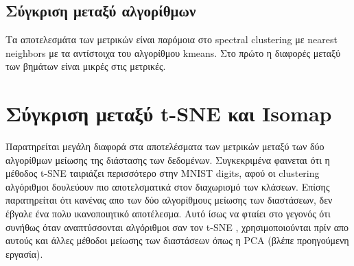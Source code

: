 \subsection{Σύγκριση μεταξύ αλγορίθμων}
Τα αποτελεσμάτα των μετρικών είναι παρόμοια στο spectral clustering με nearest neighbors με τα αντίστοιχα του αλγορίθμου kmeans. Στο πρώτο η διαφορές μεταξύ των βημάτων είναι μικρές στις μετρικές.

\clearpage

\section{Σύγκριση μεταξύ t-SNE και Isomap}
Παρατηρείται μεγάλη διαφορά στα αποτελέσματα των μετρικών μεταξύ των δύο αλγορίθμων μείωσης της διάστασης των δεδομένων. Συγκεκριμένα φαινεται ότι η μέθοδος t-SNE ταιριάζει περισσότερο στην MNIST digits, αφού οι clustering αλγόριθμοι δουλεύουν πιο αποτελσματικά στον διαχωρισμό των κλάσεων. Επίσης παρατηρείται ότι κανένας απο των δύο αλγορίθμους μείωσης των διαστάσεων, δεν έβγαλε ένα πολυ ικανοποιητικό αποτέλεσμα. Αυτό ίσως να φταίει στο γεγονός ότι συνήθως όταν αναπτύσσονται αλγόριθμοι σαν τον t-SNE , χρησιμοποιούνται πρίν απο αυτούς και άλλες μέθοδοι μείωσης των διαστάσεων όπως η PCA (βλέπε προηγούμενη εργασία).